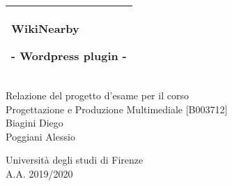 %
%
%
%
%
\begin{titlepage}
  \addtolength{\hoffset}{0.5\evensidemargin-0.5\oddsidemargin} %
  \noindent%
  \begin{tabular}{@{}p{\textwidth}@{}}
    \toprule[2pt]
    \midrule
    \vspace{0.2cm}
    \begin{center}
    \Huge{\textbf{
      WikiNearby%
    }}
    \end{center}
    \begin{center}
      \Large{
        - Wordpress plugin -%
      }
    \end{center}
    \vspace{0.2cm}\\
    \midrule
    \toprule[2pt]
  \end{tabular}
  \vspace{4 cm}
  \begin{center}
    {\Large
      Relazione del progetto d'esame per il corso \\
      Progettazione e Produzione Multimediale [B003712]
    }\\
    \vspace{0.4cm}
    {\Large
      Biagini Diego\\[0.4cm]
      Poggiani Alessio%
    }
  \end{center}
  \vfill
  \begin{center}
  Università degli studi di Firenze\\
  A.A. 2019/2020
  \end{center}
\end{titlepage}

